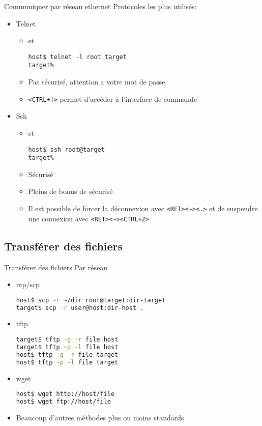 \begin{frame}[fragile=singleslide]{Communiquer par réseau ethernet}
  Protocoles les plus utilisés:
  \begin{itemize}
  \item Telnet
    \begin{itemize}
    \item {} et 
\begin{lstlisting}
host$ telnet -l root target
target%
\end{lstlisting} %
    \item   Pas   sécurisé,   attention   a   votre   mot   de   passe
    \item \verb/<CTRL+]>/ permet d'accéder à l'interface de commande
    \end{itemize}
  \item Ssh
    \begin{itemize}
    \item {} et 
\begin{lstlisting}
host$ ssh root@target
target%
\end{lstlisting} %
    \item Sécurisé
    \item Pleins de bonus de sécurisé
    \item   Il   est   possible   de  forcer   la   déconnexion   avec
      \verb/<RET><~><.>/   et   de   suspendre  une   connexion   avec
      \verb/<RET><~><CTRL+Z>/
    \end{itemize}
  \end{itemize}
\end{frame}

\subsection{Transférer des fichiers}

\begin{frame}[fragile=singleslide]{Transférer des fichiers}
  Par réseau
  \begin{itemize}
  \item rcp/scp
\begin{lstlisting}[language=sh]
host$ scp -r ~/dir root@target:dir-target
target$ scp -r user@host:dir-host .
\end{lstlisting} %
  \item tftp
\begin{lstlisting}[language=sh]
target$ tftp -g -r file host
target$ tftp -p -l file host
host$ tftp -g -r file target
host$ tftp -p -l file target
\end{lstlisting} %
  \item wget
\begin{lstlisting}[language=sh]
host$ wget http://host/file
host$ wget ftp://host/file
\end{lstlisting} %
  \item Beaucoup d'autres méthodes plus ou moins standards
  \end{itemize}
\end{frame}

